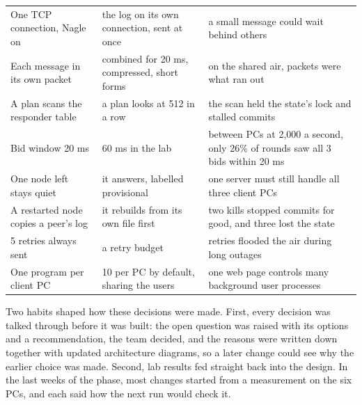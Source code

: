 \begin{table}[!htb]
\begin{tabularx}{\linewidth}{@{}P{3.9cm}P{4.1cm}L@{}}
One TCP connection, Nagle on & the log on its own connection, sent at once & a small message could wait behind others \\
Each message in its own packet & combined for 20 ms, compressed, short forms & on the shared air, packets were what ran out \\
A plan scans the responder table & a plan looks at 512 in a row & the scan held the state's lock and stalled commits \\
Bid window 20 ms & 60 ms in the lab & between PCs at 2,000 a second, only 26\% of rounds saw all 3 bids within 20 ms \\
One node left stays quiet & it answers, labelled provisional & one server must still handle all three client PCs \\
A restarted node copies a peer's log & it rebuilds from its own file first & two kills stopped commits for good, and three lost the state \\
5 retries always sent & a retry budget & retries flooded the air during long outages \\
One program per client PC & 10 per PC by default, sharing the users & one web page controls many background user processes \\
\bottomrule
\end{tabularx}
\end{table}

Two habits shaped how these decisions were made. First, every decision was talked through before it was built: the open question was raised with its options and a recommendation, the team decided, and the reasons were written down together with updated architecture diagrams, so a later change could see why the earlier choice was made. Second, lab results fed straight back into the design. In the last weeks of the phase, most changes started from a measurement on the six PCs, and each said how the next run would check it.

